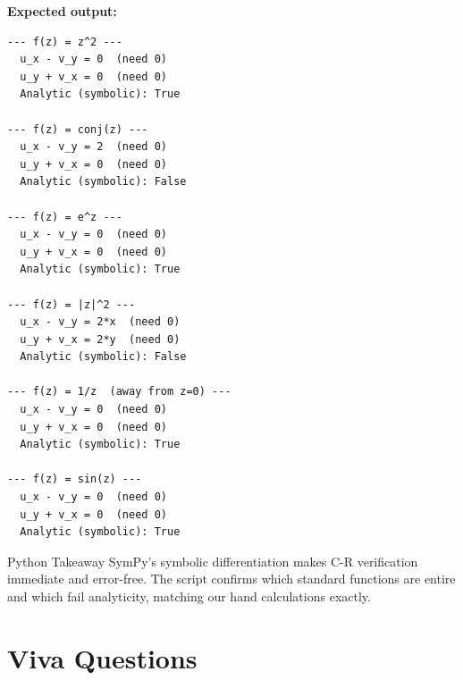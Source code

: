\documentclass[12pt,a4paper]{article}
\begin{document}
\textbf{Expected output:}
\begin{verbatim}
--- f(z) = z^2 ---
  u_x - v_y = 0  (need 0)
  u_y + v_x = 0  (need 0)
  Analytic (symbolic): True

--- f(z) = conj(z) ---
  u_x - v_y = 2  (need 0)
  u_y + v_x = 0  (need 0)
  Analytic (symbolic): False

--- f(z) = e^z ---
  u_x - v_y = 0  (need 0)
  u_y + v_x = 0  (need 0)
  Analytic (symbolic): True

--- f(z) = |z|^2 ---
  u_x - v_y = 2*x  (need 0)
  u_y + v_x = 2*y  (need 0)
  Analytic (symbolic): False

--- f(z) = 1/z  (away from z=0) ---
  u_x - v_y = 0  (need 0)
  u_y + v_x = 0  (need 0)
  Analytic (symbolic): True

--- f(z) = sin(z) ---
  u_x - v_y = 0  (need 0)
  u_y + v_x = 0  (need 0)
  Analytic (symbolic): True
\end{verbatim}

\begin{learnbox}{Python Takeaway}
SymPy's symbolic differentiation makes C-R verification immediate and error-free. The script confirms which standard functions are entire and which fail analyticity, matching our hand calculations exactly.
\end{learnbox}

\section{Viva Questions}
\end{document}
